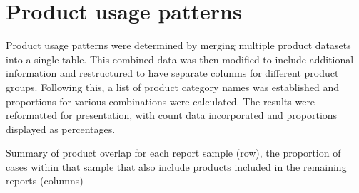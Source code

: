 \documentclass[
]{article}
\begin{document}
\section{Product usage patterns}\label{product-usage-patterns}

Product usage patterns were determined by merging multiple product
datasets into a single table. This combined data was then modified to
include additional information and restructured to have separate columns
for different product groups. Following this, a list of product category
names was established and proportions for various combinations were
calculated. The results were reformatted for presentation, with count
data incorporated and proportions displayed as percentages.

\begin{table}

\caption{\label{tbl-productusage}Summary of product overlap for each
report sample (row), the proportion of cases within that sample that
also include products included in the remaining reports (columns)}

\centering{

}
\end{table}
\end{document}

